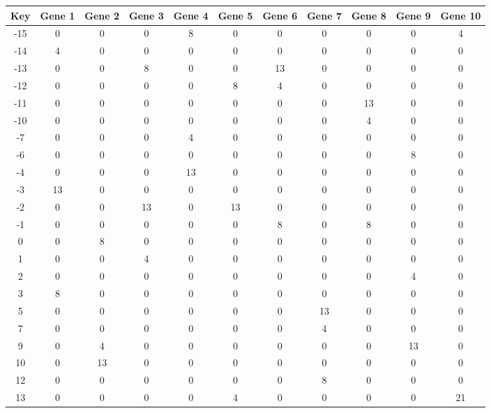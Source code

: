 \begin{tabular}{|c|c|c|c|c|c|c|c|c|c|c|}
\hline
Key & Gene 1 & Gene 2 & Gene 3 & Gene 4 & Gene 5 & Gene 6 & Gene 7 & Gene 8 & Gene 9 & Gene 10 \\
\hline
-15 & 0 & 0 & 0 & 8 & 0 & 0 & 0 & 0 & 0 & 4 \\
-14 & 4 & 0 & 0 & 0 & 0 & 0 & 0 & 0 & 0 & 0 \\
-13 & 0 & 0 & 8 & 0 & 0 & 13 & 0 & 0 & 0 & 0 \\
-12 & 0 & 0 & 0 & 0 & 8 & 4 & 0 & 0 & 0 & 0 \\
-11 & 0 & 0 & 0 & 0 & 0 & 0 & 0 & 13 & 0 & 0 \\
-10 & 0 & 0 & 0 & 0 & 0 & 0 & 0 & 4 & 0 & 0 \\
-7 & 0 & 0 & 0 & 4 & 0 & 0 & 0 & 0 & 0 & 0 \\
-6 & 0 & 0 & 0 & 0 & 0 & 0 & 0 & 0 & 8 & 0 \\
-4 & 0 & 0 & 0 & 13 & 0 & 0 & 0 & 0 & 0 & 0 \\
-3 & 13 & 0 & 0 & 0 & 0 & 0 & 0 & 0 & 0 & 0 \\
-2 & 0 & 0 & 13 & 0 & 13 & 0 & 0 & 0 & 0 & 0 \\
-1 & 0 & 0 & 0 & 0 & 0 & 8 & 0 & 8 & 0 & 0 \\
0 & 0 & 8 & 0 & 0 & 0 & 0 & 0 & 0 & 0 & 0 \\
1 & 0 & 0 & 4 & 0 & 0 & 0 & 0 & 0 & 0 & 0 \\
2 & 0 & 0 & 0 & 0 & 0 & 0 & 0 & 0 & 4 & 0 \\
3 & 8 & 0 & 0 & 0 & 0 & 0 & 0 & 0 & 0 & 0 \\
5 & 0 & 0 & 0 & 0 & 0 & 0 & 13 & 0 & 0 & 0 \\
7 & 0 & 0 & 0 & 0 & 0 & 0 & 4 & 0 & 0 & 0 \\
9 & 0 & 4 & 0 & 0 & 0 & 0 & 0 & 0 & 13 & 0 \\
10 & 0 & 13 & 0 & 0 & 0 & 0 & 0 & 0 & 0 & 0 \\
12 & 0 & 0 & 0 & 0 & 0 & 0 & 8 & 0 & 0 & 0 \\
13 & 0 & 0 & 0 & 0 & 4 & 0 & 0 & 0 & 0 & 21 \\
\hline
\end{tabular}